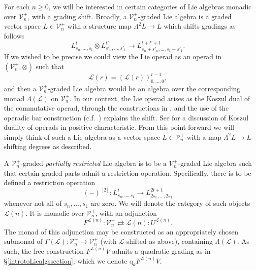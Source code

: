 \documentclass[11pt]{amsart} \renewcommand{\baselinestretch}{1.2}
\theoremstyle{plain}
\numberwithin{equation}{section} %
\theoremstyle{plain}
\numberwithin{equation}{chapter} %
\DeclareMathOperator{\im}{im}
\newcommand{\DASH}{\mathrm{-}}
\renewcommand{\to}{\longrightarrow}
\newcommand{\scrL}{\mathscr{L}}
\newcommand{\calL}{\mathcal{L}}
\newcommand{\calV}{\mathcal{V}}
\newcommand{\citeBOX}[2][]{\cite[\mbox{#1}]{#2}}
\newcommand{\LieOperad}{{\scrL}}
\newcommand{\restn}[1]{#1^{[2]}}
\newcommand{\vect}[2]{\calV^{#1}_{#2}}
\newcommand{\quadgrad}[1]{\mathrm{q}_{#1}}
\begin{document}
\begin{homotopy operations for PRLs}
For each $n\geq0$, we will be interested in certain categories of Lie algebras monadic over $\vect{+}{n}$, with a grading shift. Broadly, a $\vect{+}{n}$-graded Lie algebra is a graded vector space $L\in\vect{+}{n}$ with a structure map $\Lambda^2 L\to L$ which shifts gradings as follows
\[L^{t}_{s_n,\ldots,s_1}\otimes L^{t'}_{s'_n,\ldots,s'_1}\to L^{t+t'+1}_{s_n+s'_n,\ldots,s_1+s'_1}.\]
If we wished to be precise we could  view the Lie operad as an operad in $(\vect{+}{n},\otimes )$ such that
\[\LieOperad(r)=(\LieOperad(r))^{r-1}_{0,\ldots,0},\]
and then a $\vect{+}{n}$-graded Lie algebra would be an algebra over the corresponding monad $\Lambda(\LieOperad)$ on $\vect{+}{n}$. In our context, the Lie operad arises as the Koszul dual of the commutative operad, through the constructions in \citeBOX[\S5]{MR1089001}, and the use of the operadic bar construction (c.f.\ \citeBOX[\S3]{FresseKoszulDuality.pdf}) explains the shift. See \citeBOX[\S5.3.4]{FresseKoszulDuality.pdf} for a discussion of Koszul duality of operads in positive characteristic. From this point forward we will simply think of such a Lie algebra as a vector space $L\in\vect{+}{n}$ with a map $\Lambda^2L\to L$ shifting degrees as described. %

A $\vect{+}{n}$-graded \emph{partially restricted} Lie algebra is to be a $\vect{+}{n}$-graded  Lie algebra such that certain graded parts admit a restriction operation. Specifically, there is to be defined a restriction operation
\[\restn{(\DASH)}:L^t_{s_n,\ldots,s_1}\to L^{2t+1}_{2s_n,\ldots,2s_1}\]
whenever not all of $s_n,\ldots,s_{1}$ are zero. We will denote the category of such objects $\calL(n)$. It is monadic over $\vect{+}{n}$, with an adjunction
\[F^{\calL(n)}:\vect{+}{n}\rightleftarrows \calL(n):U^{\calL(n)}.\]
The monad of this adjunction may be constructed as an appropriately chosen submonad of $\Gamma(\LieOperad):\vect{+}{n}\to \vect{+}{n}$ (with $\LieOperad$ shifted as above), containing $\Lambda(\LieOperad)$. As such, the free construction $F^{\calL(n)}V$ admits a quadratic grading as in \S\ref{introtoLiealgssection}, which we denote $\quadgrad{k}F^{\calL(n)}V$.


\end{homotopy operations for PRLs}
\end{document}
